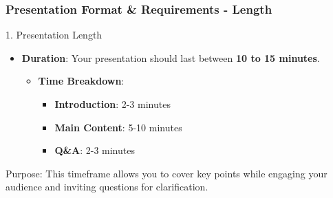 \documentclass[aspectratio=169]{beamer}
\begin{document}
\begin{frame}[fragile]
    \frametitle{Presentation Format \& Requirements - Length}
    \begin{block}{1. Presentation Length}
        \begin{itemize}
            \item \textbf{Duration}: Your presentation should last between \textbf{10 to 15 minutes}.
            \begin{itemize}
                \item \textbf{Time Breakdown}:
                    \begin{itemize}
                        \item \textbf{Introduction}: 2-3 minutes
                        \item \textbf{Main Content}: 5-10 minutes
                        \item \textbf{Q\&A}: 2-3 minutes
                    \end{itemize}
            \end{itemize}
        \end{itemize}
        Purpose: This timeframe allows you to cover key points while engaging your audience and inviting questions for clarification.
    \end{block}
\end{frame}
\end{document}
